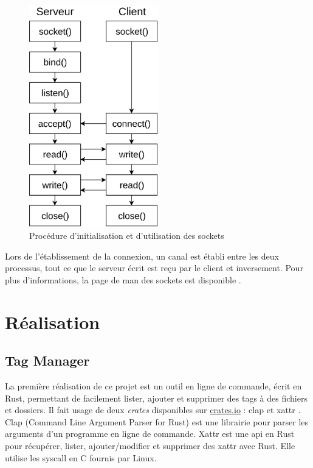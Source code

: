 \documentclass[a4paper, 12pt]{article}
\begin{document}
\begin{figure}
    \begin{center}
        \includegraphics[width=0.5\textwidth]{images/sockets.png}
    \end{center}
    \caption{Procédure d'initialisation et d'utilisation des sockets}
    \label{sockets_procedure}
\end{figure}
Lors de l'établissement de la connexion, un canal est établi entre les deux processus, tout ce que 
le serveur écrit est reçu par le client et inversement. Pour plus d'informations, la page de man 
des sockets est disponible \cite{ref39}.
\newpage


\section{Réalisation} %
\subsection{Tag Manager}
La première réalisation de ce projet est un outil en ligne de commande, écrit en Rust, permettant 
de facilement lister, ajouter et supprimer des tags à des fichiers et dossiers. Il fait usage de 
deux \textit{crates} disponibles sur \href{https://crates.io}{crates.io} : clap \cite{ref22} et 
xattr \cite{ref23}. Clap (Command Line Argument Parser for Rust) est une librairie pour parser 
les arguments d'un programme en ligne de commande. Xattr est une \acrshort{api} en Rust pour récupérer, lister, 
ajouter/modifier et supprimer des \acrshort{xattr} avec Rust. Elle utilise les \acrshort{syscall} 
en C fournis par Linux.
\end{document}
